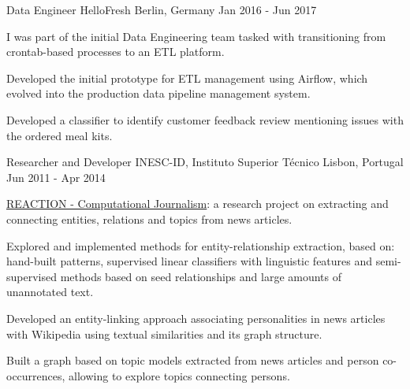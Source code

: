 \begin{cventries}
  \cventry
    {Data Engineer} %
    {HelloFresh} %
    {Berlin, Germany} %
    {Jan 2016 - Jun 2017} %
    {
      \begin{cvitems} %
        \item {I was part of the initial Data Engineering team tasked with transitioning from crontab-based processes to an ETL platform.}
        \item {Developed the initial prototype for ETL management using Airflow, which evolved into the production data pipeline management system.}
        \item {Developed a classifier to identify customer feedback review mentioning issues with the ordered meal kits.}
      \end{cvitems}
    }
	
  \cventry
    {Researcher and Developer} %
    {INESC-ID, Instituto Superior Técnico} %
    {Lisbon, Portugal} %
    {Jun 2011 - Apr 2014} %
    {
      \begin{cvitems} %
        \item {\href{http://arquivo.pt/wayback/20151118124735/http://dmir.inesc-id.pt/project/Reaction}{REACTION - Computational Journalism}: a research project on extracting and connecting entities, relations and topics from news articles.}
        \item {Explored and implemented methods for entity-relationship extraction, based on: hand-built patterns, supervised linear classifiers with linguistic features and semi-supervised methods based on seed relationships and large amounts of unannotated text.}
		\item {Developed an entity-linking approach associating personalities in news articles with Wikipedia using textual similarities and its graph structure.}
        \item {Built a graph based on topic models extracted from news articles and person co-occurrences, allowing to explore topics connecting persons.}
      \end{cvitems}
    }



\end{cventries}
